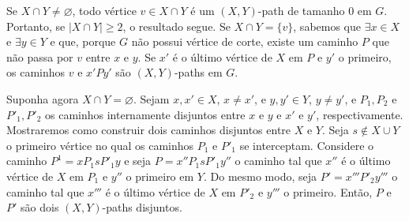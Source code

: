 
Se $X \cap Y \ne \varnothing$, todo vértice $v \in X \cap Y$ é um $(X,Y)$-path
de tamanho $0$ em $G$. Portanto, se $|X \cap Y| \ge 2$, o resultado segue. Se
$X \cap Y = \{v\}$, sabemos que $\exists x \in X$ e $\exists y \in Y$ e que,
porque $G$ não possui vértice de corte, existe um caminho $P$ que não passa por
$v$ entre $x$ e $y$. Se $x'$ é o último vértice de $X$ em $P$ e $y'$ o
primeiro, os caminhos $v$ e $x'Py'$ são $(X,Y)$-paths em $G$.

Suponha agora $X \cap Y = \varnothing$. Sejam $x, x' \in X$, $x \ne x'$, e
$y, y' \in Y$, $y \ne y'$, e $P_1, P_2$ e $P'_1, P'_2$ os caminhos internamente
disjuntos entre $x$ e $y$ e $x'$ e $y'$, respectivamente. Mostraremos como
construir dois caminhos disjuntos entre $X$ e $Y$. Seja $s \not \in X \cup Y$ o
primeiro vértice no qual os caminhos $P_1$ e $P'_1$ se interceptam. Considere o
caminho $P^1 = xP_1sP'_1y$ e seja $P = x''P_1sP'_1y''$ o caminho tal que $x''$
é o último vértice de $X$ em $P_1$ e $y''$ o primeiro em $Y$. Do mesmo modo,
seja $P' = x'''P'_2y'''$ o caminho tal que $x'''$ é o último vértice de $X$ em
$P'_2$ e $y'''$ o primeiro. Então, $P$ e $P'$ são dois $(X,Y)$-paths disjuntos.

